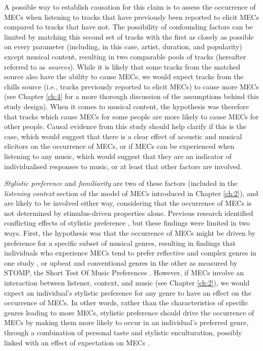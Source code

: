 A possible way to establish causation for this claim is to assess the occurrence of MECs when listening to tracks that have previously been reported to elicit MECs compared to tracks that have not. The possibility of confounding factors can be limited by matching this second set of tracks with the first as closely as possible on every parameter (including, in this case, artist, duration, and popularity) except musical content, resulting in two comparable pools of tracks (hereafter referred to as \emph{sources}). While it is likely that some tracks from the matched source also have the ability to cause MECs, we would expect tracks from the chills source (i.e., tracks previously reported to elicit MECs) to cause more MECs (see Chapter \ref{ch:4} for a more thorough discussion of the assumptions behind this study design). When it comes to musical content, the hypothesis was therefore that tracks which cause MECs for some people are more likely to cause MECs for other people. Causal evidence from this study should help clarify if this is the case, which would suggest that there is a clear effect of acoustic and musical elicitors on the occurrence of MECs, or if MECs can be experienced when listening to any music, which would suggest that they are an indicator of individualised responses to music, or at least that other factors are involved.

\emph{Stylistic preference} and \emph{familiarity} are two of these factors (included in the \emph{listening context} section of the model of MECs introduced in Chapter \ref{ch:2}), and are likely to be involved either way, considering that the occurrence of MECs is not determined by stimulus-driven properties alone. Previous research identified conflicting effects of stylistic preference \parencite{bannister2018, nusbaum2011}, but these findings were limited in two ways. First, the hypothesis was that the occurrence of MECs might be driven by preference for a specific subset of musical genres, resulting in findings that individuals who experience MECs tend to prefer reflective and complex genres in one study \parencite{bannister2018}, or upbeat and conventional genres in the other \parencite{nusbaum2011} as measured by STOMP, the Short Test Of Music Preferences \parencite{rentfrow2003}. However, if MECs involve an interaction between listener, context, and music (see Chapter \ref{ch:2}), we would expect an individual's stylistic preference for any genre to have an effect on the occurrence of MECs. In other words, rather than the characteristics of specific genres leading to more MECs, stylistic preference should drive the occurrence of MECs by making them more likely to occur in an individual's preferred genre, through a combination of personal taste and stylistic enculturation, possibly linked with an effect of expectation on MECs \parencite[see][]{beier2020}. 

